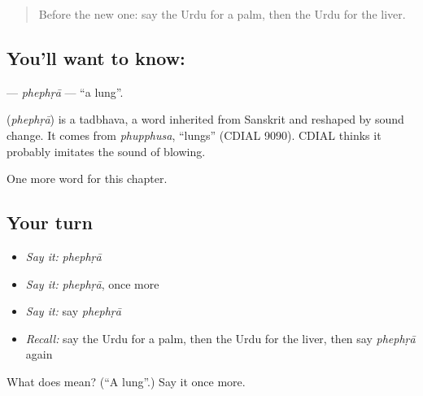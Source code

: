 \label{lesson:UR-C186-phephra}



\begin{quote}
Before the new one: say the Urdu for a palm, then the Urdu for the liver.
\end{quote}

\subsection*{You'll want to know: }
\textbf{} — \emph{phephṛā} — \textquotedblleft{}a lung\textquotedblright{}.

\begin{cousinweb}
\textbf{} (\emph{phephṛā}) is a tadbhava, a word inherited from Sanskrit and reshaped by sound change. It comes from \emph{phupphusa}, \textquotedblleft{}lungs\textquotedblright{} (CDIAL 9090). CDIAL thinks it probably imitates the sound of blowing.
\end{cousinweb}

\begin{grammarlens}[title={What you've built}]
One more word for this chapter.
\end{grammarlens}

\subsection*{Your turn}
\begin{itemize}
\raggedright
  \item \emph{Say it:} \emph{phephṛā}
  \item \emph{Say it:} \emph{phephṛā}, once more
  \item \emph{Say it:} say \emph{phephṛā}
  \item \emph{Recall:} say the Urdu for a palm, then the Urdu for the liver, then say \emph{phephṛā} again
\end{itemize}

\begin{tcolorbox}[breakable,colback=teal!4,colframe=teal!35!black,title={Before you move on}]
What does  mean? (\textquotedblleft{}A lung\textquotedblright{}.) Say it once more.
\end{tcolorbox}
